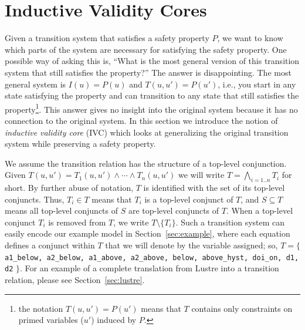 \section{Inductive Validity Cores}
\label{sec:ivc}
\newcommand{\ivc}{\textit{IVC}\xspace}
\newcommand{\mivc}{\textit{MIVC}}
\newcommand{\mivcs}{\mivc s}
\newcommand{\aivc}{\textit{AIVC}}
\newcommand{\must}{\textit{MUST}}
\newcommand{\may}{\textit{MAY}}

\newcommand{\bq}{\textsc{BaseQuery}\xspace}
\newcommand{\iq}{\textsc{IndQuery}\xspace}
\newcommand{\fq}{\textsc{FullQuery}\xspace}

\newcommand{\mink}{\textsc{MinimizeK}\xspace}
\newcommand{\reduceinv}{\textsc{ReduceInvariants}\xspace}
\newcommand{\minivc}{\textsc{MinimizeIvc}\xspace}

\newcommand{\checksat}{\textsc{CheckSat}}
\newcommand{\isadeq}{\textsc{CheckAdq}}
\newcommand{\actlit}{\textsc{ActLit}}
\newcommand{\unsatcore}{\textsc{UnsatCore}\xspace}
\newcommand{\unsat}{\texttt{UNSAT}\xspace}
\newcommand{\sat}{\texttt{SAT}\xspace}

\newcommand{\getivc}{\textsc{GetIVC}}
\newcommand{\getmodel}{\textsc{GetLiteralsFromMaxModel}}
\newcommand{\aivcalg}{\texttt{\small{All\_IVCs}}}
\newcommand{\blockup}{\textsc{BlockUp}}
\newcommand{\blockdown}{\textsc{BlockDown}}
\newcommand{\mis}{\textit{MIS}}
\newcommand{\mcs}{\textit{MCS}}

Given a transition system that satisfies a safety property $P$, we
want to know which parts of the system are necessary for satisfying
the safety property. One possible way of asking this is, ``What is the
most general version of this transition system that still satisfies
the property?'' The answer is disappointing. The most general system is
$I(u) = P(u)$ and $T(u, u') = P(u')$, i.e., you start in any state
satisfying the property and can transition to any state that still
satisfies the property\footnote{the notation $T(u, u') = P(u')$ means that $T$ contains only constraints on primed variables ($u'$) induced by $P$.}.  This answer gives no insight into the original
system because it has no connection to the original system. In this
section we introduce the notion of {\em inductive validity core} (IVC)
which looks at generalizing the original transition system while
preserving a safety property.

We assume the transition relation has the structure of a top-level conjunction.  Given $T(u, u') = T_1(u, u') \land \cdots \land T_n(u, u')$ we will write $T = \bigwedge_{i=1..n}T_i$ for short.
By further abuse of notation,
$T$ is identified with the set of its top-level conjuncts. Thus, $T_i \in
T$ means that $T_i$ is a top-level conjunct of $T$, and $S
\subseteq T$ means all top-level conjuncts of $S$ are top-level
conjuncts of $T$. When a top-level conjunct $T_i$ is removed from $T$, we write $T \setminus \{T_i\}$. Such a transition system can easily encode our example model in Section~\ref{sec:example}, where each equation defines a conjunct within $T$ that we will denote by the variable assigned; so, $T = \{$ {\small \texttt{a1\_below, a2\_below, a1\_above, a2\_above, below, above\_hyst, doi\_on, d1, d2}} $\}$.  For an example of a complete translation from Lustre into a transition relation, please see Section~\ref{sec:lustre}.

